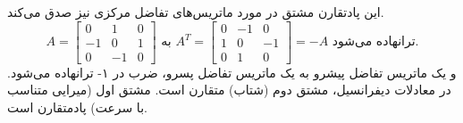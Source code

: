 \documentclass[12pt, a4paper]{book}
\begin{document}
\begin{enumerate}
		این پادتقارن مشتق در مورد ماتریس‌های تفاضل مرکزی نیز صدق می‌کند.
		\[ A = \begin{bmatrix} 0 & 1 & 0 \\ -1 & 0 & 1 \\ 0 & -1 & 0 \end{bmatrix} \text{ به } A^T = \begin{bmatrix} 0 & -1 & 0 \\ 1 & 0 & -1 \\ 0 & 1 & 0 \end{bmatrix} = -A \text{ ترانهاده می‌شود.} \]
		و یک ماتریس تفاضل پیشرو به یک ماتریس تفاضل پسرو، ضرب در ۱- ترانهاده می‌شود. در معادلات دیفرانسیل، مشتق دوم (شتاب) متقارن است. مشتق اول (میرایی متناسب با سرعت) پادمتقارن است.
		
	\end{enumerate}
	
\end{document}
